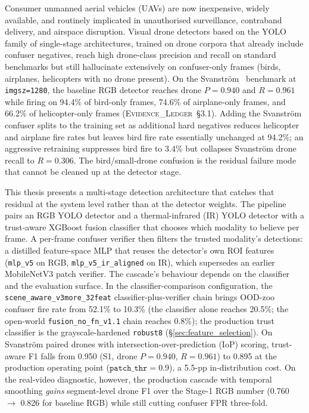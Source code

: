 \documentclass[12pt,a4paper,oneside,openright]{book}
\begin{document}
Consumer unmanned aerial vehicles (UAVs) are now inexpensive, widely available, and routinely implicated in unauthorised surveillance, contraband delivery, and airspace disruption. Visual drone detectors based on the YOLO family of single-stage architectures, trained on drone corpora that already include confuser negatives, reach high drone-class precision and recall on standard benchmarks but still hallucinate extensively on confuser-only frames (birds, airplanes, helicopters with no drone present). On the Svanstr\"om~\cite{svanstrom2021real} benchmark at \texttt{imgsz=1280}, the baseline RGB detector reaches drone $P=0.940$ and $R=0.961$ while firing on 94.4\% of bird-only frames, 74.6\% of airplane-only frames, and 66.2\% of helicopter-only frames (\textsc{Evidence\_Ledger}~\S3.1). Adding the Svanstr\"om confuser splits to the training set as additional hard negatives reduces helicopter and airplane fire rates but leaves bird fire rate essentially unchanged at 94.2\%; an aggressive retraining suppresses bird fire to 3.4\% but collapses Svanstr\"om drone recall to $R=0.306$. The bird/small-drone confusion is the residual failure mode that cannot be cleaned up at the detector stage.

This thesis presents a multi-stage detection architecture that catches that residual at the system level rather than at the detector weights. The pipeline pairs an RGB YOLO detector and a thermal-infrared (IR) YOLO detector with a trust-aware XGBoost fusion classifier that chooses which modality to believe per frame. A per-frame confuser verifier then filters the trusted modality's detections: a distilled feature-space MLP that reuses the detector's own ROI features (\texttt{mlp\_v5} on RGB, \texttt{mlp\_v5\_ir\_aligned} on IR), which supersedes an earlier MobileNetV3 patch verifier. The cascade's behaviour depends on the classifier and the evaluation surface. In the classifier-comparison configuration, the \texttt{scene\_aware\_v3more\_32feat} classifier-plus-verifier chain brings OOD-zoo confuser fire rate from 52.1\% to 10.3\% (the classifier alone reaches 20.5\%; the open-world \texttt{fusion\_no\_fn\_v1.1} chain reaches 0.8\%); the production trust classifier is the grayscale-hardened \texttt{robust8} (\S\ref{sec:feature_selection}). On Svanstr\"om paired drones with intersection-over-prediction (IoP) scoring, trust-aware F1 falls from 0.950 (S1, drone $P=0.940$, $R=0.961$) to 0.895 at the production operating point ($\mathtt{patch\_thr}=0.9$), a 5.5-pp in-distribution cost. On the real-video diagnostic, however, the production cascade with temporal smoothing \emph{gains} segment-level drone F1 over the Stage-1 RGB number (0.760 $\to$ 0.826 for baseline RGB) while still cutting confuser FPR three-fold.
\end{document}
